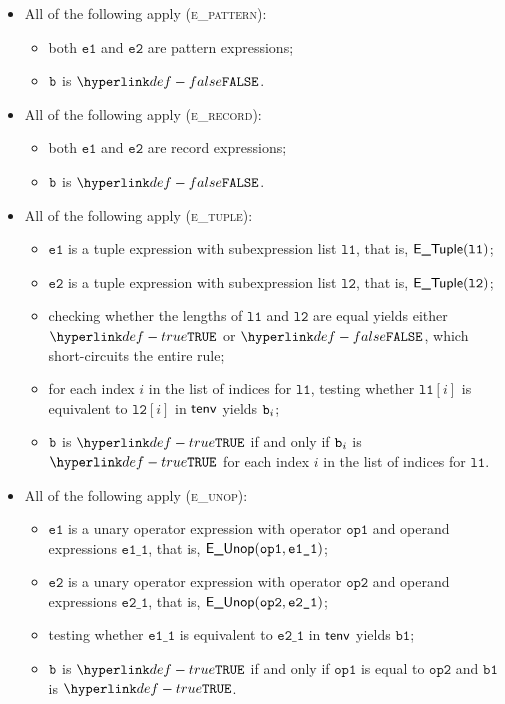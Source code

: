 \documentclass{book}
\newcommand\ProseOrTypeError[0]{\ProseTerminateAs{\TypeErrorConfig}}
\newcommand\veone[0]{\texttt{e1}}
\newcommand\vetwo[0]{\texttt{e2}}
\newcommand\opone[0]{\texttt{op1}}
\newcommand\optwo[0]{\texttt{op2}}
\newcommand\veoneone[0]{\texttt{e1\_1}}
\newcommand\vetwoone[0]{\texttt{e2\_1}}
\newcommand\vbone[0]{\texttt{b1}}
\newcommand\vlone[0]{\texttt{l1}}
\newcommand\vltwo[0]{\texttt{l2}}
\begin{document}
\begin{itemize}
  \item All of the following apply (\textsc{e\_pattern}):
  \begin{itemize}
    \item both $\veone$ and $\vetwo$ are pattern expressions;
    \item $\texttt{b}$ is $\False$.
  \end{itemize}

  \item All of the following apply (\textsc{e\_record}):
  \begin{itemize}
    \item both $\veone$ and $\vetwo$ are record expressions;
    \item $\texttt{b}$ is $\False$.
  \end{itemize}

  \item All of the following apply (\textsc{e\_tuple}):
  \begin{itemize}
    \item $\veone$ is a tuple expression with subexpression list $\vlone$,
          that is, $\ETuple(\vlone)$;
    \item $\vetwo$ is a tuple expression with subexpression list $\vltwo$,
          that is, $\ETuple(\vltwo)$;
    \item checking whether the lengths of $\vlone$ and $\vltwo$ are equal yields either $\True$ or $\False$, which short-circuits
          the entire rule;
    \item for each index $i$ in the list of indices for $\vlone$, testing whether $\vlone[i]$ is equivalent to $\vltwo[i]$
          in $\textsf{tenv}$ yields $\texttt{b}_i$\ProseOrTypeError;
    \item $\texttt{b}$ is $\True$ if and only if $\texttt{b}_i$ is $\True$ for each index $i$ in the list of indices for $\vlone$.
  \end{itemize}

  \item All of the following apply (\textsc{e\_unop}):
  \begin{itemize}
    \item $\veone$ is a unary operator expression with operator $\opone$ and operand expressions $\veoneone$,
          that is, $\EUnop(\opone, \veoneone)$;
    \item $\vetwo$ is a unary operator expression with operator $\optwo$ and operand expressions $\vetwoone$,
          that is, $\EUnop(\optwo, \vetwoone)$;
    \item testing whether $\veoneone$ is equivalent to $\vetwoone$ in $\textsf{tenv}$ yields $\vbone$;
    \item $\texttt{b}$ is $\True$ if and only if $\opone$ is equal to $\optwo$ and $\vbone$ is $\True$.
  \end{itemize}


\end{itemize}
\end{document}
